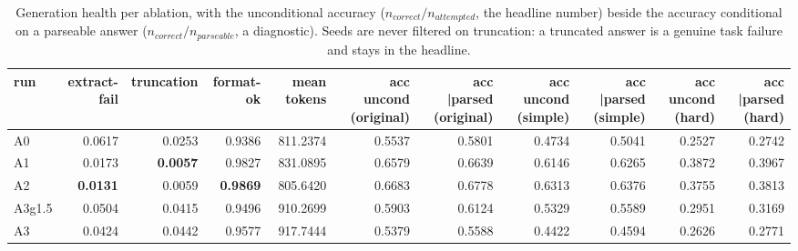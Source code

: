 \begin{table}[t]
\centering
\small
\begin{tabular}{lrrrrrrrrrr}
\toprule
run & extract-fail & truncation & format-ok & mean tokens & acc uncond (original) & acc |parsed (original) & acc uncond (simple) & acc |parsed (simple) & acc uncond (hard) & acc |parsed (hard) \\
\midrule
A0 & 0.0617 & 0.0253 & 0.9386 & 811.2374 & 0.5537 & 0.5801 & 0.4734 & 0.5041 & 0.2527 & 0.2742 \\
A1 & 0.0173 & \textbf{0.0057} & 0.9827 & 831.0895 & 0.6579 & 0.6639 & 0.6146 & 0.6265 & 0.3872 & 0.3967 \\
A2 & \textbf{0.0131} & 0.0059 & \textbf{0.9869} & 805.6420 & 0.6683 & 0.6778 & 0.6313 & 0.6376 & 0.3755 & 0.3813 \\
A3g1.5 & 0.0504 & 0.0415 & 0.9496 & 910.2699 & 0.5903 & 0.6124 & 0.5329 & 0.5589 & 0.2951 & 0.3169 \\
A3 & 0.0424 & 0.0442 & 0.9577 & 917.7444 & 0.5379 & 0.5588 & 0.4422 & 0.4594 & 0.2626 & 0.2771 \\
\bottomrule
\end{tabular}
\caption{Generation health per ablation, with the unconditional accuracy ($n_{correct}/n_{attempted}$, the headline number) beside the accuracy conditional on a parseable answer ($n_{correct}/n_{parseable}$, a diagnostic). Seeds are never filtered on truncation: a truncated answer is a genuine task failure and stays in the headline.}
\label{tab:mp_health}
\end{table}